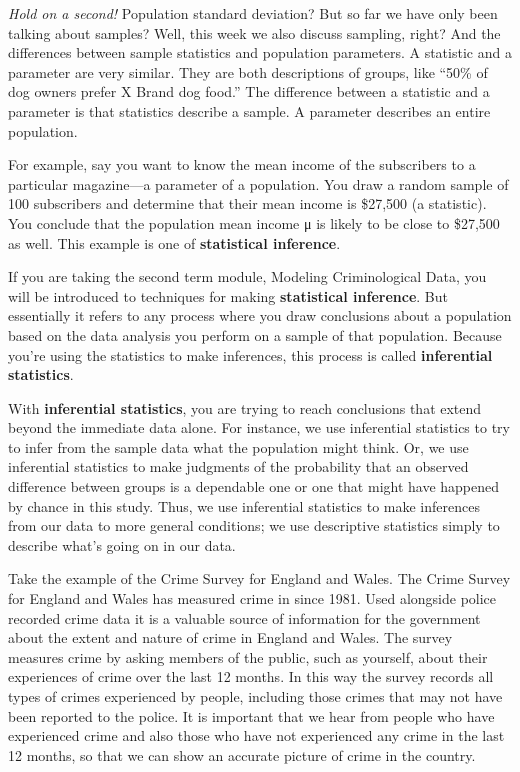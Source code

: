 \documentclass[]{book}
\theoremstyle{definition}
\theoremstyle{definition}
\theoremstyle{definition}
\theoremstyle{remark}
\begin{document}
\emph{Hold on a second!} Population standard deviation? But so far we
have only been talking about samples? Well, this week we also discuss
sampling, right? And the differences between sample statistics and
population parameters. A statistic and a parameter are very similar.
They are both descriptions of groups, like ``50\% of dog owners prefer X
Brand dog food.'' The difference between a statistic and a parameter is
that statistics describe a sample. A parameter describes an entire
population.

For example, say you want to know the mean income of the subscribers to
a particular magazine---a parameter of a population. You draw a random
sample of 100 subscribers and determine that their mean income is
\$27,500 (a statistic). You conclude that the population mean income μ
is likely to be close to \$27,500 as well. This example is one of
\textbf{statistical inference}.

If you are taking the second term module, Modeling Criminological Data,
you will be introduced to techniques for making \textbf{statistical
inference}. But essentially it refers to any process where you draw
conclusions about a population based on the data analysis you perform on
a sample of that population. Because you're using the statistics to make
inferences, this process is called \textbf{inferential statistics}.

With \textbf{inferential statistics}, you are trying to reach
conclusions that extend beyond the immediate data alone. For instance,
we use inferential statistics to try to infer from the sample data what
the population might think. Or, we use inferential statistics to make
judgments of the probability that an observed difference between groups
is a dependable one or one that might have happened by chance in this
study. Thus, we use inferential statistics to make inferences from our
data to more general conditions; we use descriptive statistics simply to
describe what's going on in our data.

Take the example of the Crime Survey for England and Wales. The Crime
Survey for England and Wales has measured crime in since 1981. Used
alongside police recorded crime data it is a valuable source of
information for the government about the extent and nature of crime in
England and Wales. The survey measures crime by asking members of the
public, such as yourself, about their experiences of crime over the last
12 months. In this way the survey records all types of crimes
experienced by people, including those crimes that may not have been
reported to the police. It is important that we hear from people who
have experienced crime and also those who have not experienced any crime
in the last 12 months, so that we can show an accurate picture of crime
in the country.
\end{document}
